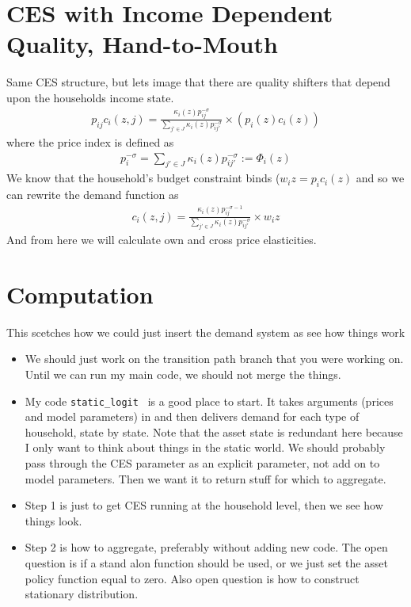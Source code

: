 \documentclass[pdftex,11pt]{article}
\begin{document}
\section{CES with Income Dependent Quality, Hand-to-Mouth}

Same CES structure, but lets image that there are quality shifters that depend upon the households income state.
\begin{align}
\nonumber
p_{ij} c_i(z,j)= \frac{\kappa_{i}(z) p_{ij}^{-\sigma}}{\sum\limits_{j' \in J} \kappa_{i}(z) p_{ij'}^{-\sigma}} \times \left( p_{i}(z) c_{i}(z) \right)
\end{align}
where the price index is defined as
\begin{align}
\nonumber
p_{i}^{-\sigma} = \sum\limits_{j' \in J} \kappa_{i}(z) p_{ij'}^{-\sigma} := \Phi_i(z)
\end{align}
We know that the household's budget constraint binds ($w_iz =  p_{i} c_{i}(z)$ and so we can rewrite the demand function as
\begin{align}
\nonumber
c_i(z,j)= \frac{\kappa_{i}(z) p_{ij}^{-\sigma-1}}{\sum\limits_{j' \in J} \kappa_{i}(z) p_{ij'}^{-\sigma}} \times w_i z
\end{align}
And from here we will calculate own and cross price elasticities.


\section{Computation}

This scetches how we could just insert the demand system as see how things work
\begin{itemize}
\item We should just work on the transition path branch that you were working on. Until we can run my main code, we should not merge the things. 

\item My code{ \tt static\_logit } is a good place to start. It takes arguments (prices and model parameters) in and then delivers demand for each type of household, state by state. Note that the asset state is redundant here because I only want to think about things in the static world. We should probably pass through the CES parameter as an explicit parameter, not add on to model parameters. Then we want it to return stuff for which to aggregate.
    
\item Step 1 is just to get CES running at the household level, then we see how things look. 
    
\item Step 2 is how to aggregate, preferably without adding new code. The open question is if a stand alon function should be used, or we just set the asset policy function equal to zero. Also open question is how to construct stationary distribution.
\end{itemize}
\end{document}
